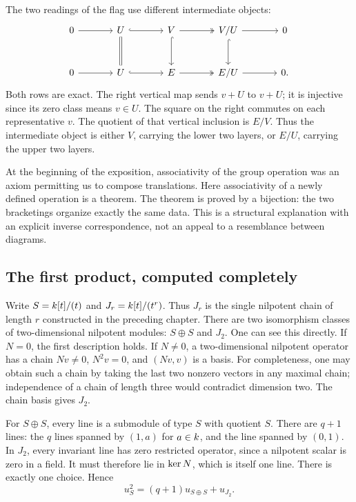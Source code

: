 The two readings of the flag use different intermediate objects:
\[
\begin{tikzcd}[column sep=large,row sep=large]
0\arrow[r]&U\arrow[r,hook]\arrow[d,equal]&V\arrow[r,two heads]\arrow[d,hook]
  &V/U\arrow[r]\arrow[d,hook]&0\\
0\arrow[r]&U\arrow[r,hook]&E\arrow[r,two heads]&E/U\arrow[r]&0.
\end{tikzcd}
\]
Both rows are exact. The right vertical map sends $v+U$ to $v+U$;
it is injective since its zero class means $v\in U$. The square on the
right commutes on each representative $v$. The quotient of that vertical
inclusion is $E/V$. Thus the intermediate object is either $V$, carrying
the lower two layers, or $E/U$, carrying the upper two layers.

At the beginning of the exposition, associativity of the group operation
was an axiom permitting us to compose translations. Here associativity
of a newly defined operation is a theorem. The theorem is proved by a
bijection: the two bracketings organize exactly the same data. This is
a structural explanation with an explicit inverse correspondence, not
an appeal to a resemblance between diagrams.

\subsection{The first product, computed completely}

Write $S=k[t]/(t)$ and $J_r=k[t]/(t^r)$. Thus $J_r$ is the single
nilpotent chain of length $r$ constructed in the preceding chapter.
There are two isomorphism classes of two-dimensional nilpotent modules:
$S\oplus S$ and $J_2$. One can see this directly. If $N=0$, the first
description holds. If $N\neq0$, a two-dimensional nilpotent operator has
a chain $Nv\neq0$, $N^2v=0$, and $(Nv,v)$ is a basis. For completeness,
one may obtain such a chain by taking the last two nonzero vectors in
any maximal chain; independence of a chain of length three would
contradict dimension two. The chain basis gives $J_2$.

For $S\oplus S$, every line is a submodule of type $S$ with quotient
$S$. There are $q+1$ lines: the $q$ lines spanned by $(1,a)$ for
$a\in k$, and the line spanned by $(0,1)$. In $J_2$, every invariant
line has zero restricted operator, since a nilpotent scalar is zero in
a field. It must therefore lie in $\operatorname{ker} N$, which is itself one line.
There is exactly one choice. Hence
\begin{equation}\label{hall:square}
u_S^2=(q+1)u_{S\oplus S}+u_{J_2}.
\end{equation}

